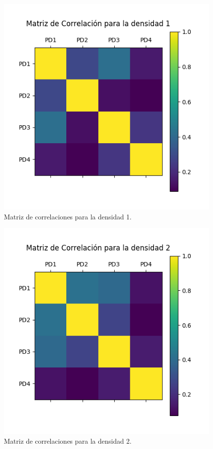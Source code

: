 \begin{figure}[h!]
	\centering
	\includegraphics[scale=0.5]{correlacionD1.jpg}
	\caption{Matriz de correlaciones para la densidad 1.}
	\label{fig:cd1}
\end{figure}
\clearpage

\begin{figure}[h!]
	\centering
	\includegraphics[scale=0.5]{correlacionD2.jpg}
	\caption{Matriz de correlaciones para la densidad 2.}
	\label{fig:cd2}
\end{figure}

